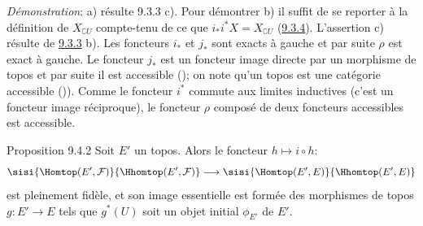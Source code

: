 \documentclass[10pt]{../fichiers-configuration-latex/smfart}
\begin{document}
\noindent \emph{Démonstration}: a) résulte  9.3.3 c). Pour
démontrer b) il suffit de se reporter à la définition
 de $X_{\complement U}$ compte-tenu de ce que
$i_{\ast}i^{\ast}X=X_{\complement U}$ (\hyperref[IV.prop9.3.4]{9.3.4}).
L'assertion c) résulte de \hyperref[IV.prop9.3.3]{9.3.3} b). Les foncteurs
$i_{\ast}$ et $j_{\ast}$ sont exacts à gauche et par suite $\rho$
est exact à gauche. Le foncteur $j_{\ast}$ est un foncteur image
directe par un morphisme de topos et par suite il est accessible
(); on note qu'un topos est une catégorie accessible
()). Comme le foncteur $i^{\ast}$ commute aux
limites inductives (c'est un foncteur image réciproque), le foncteur
$\rho$ composé de deux foncteurs accessibles est accessible.

\begin{enonce*}{Proposition 9.4.2}
Soit $E'$ un topos. Alors le foncteur $h\mapsto i\circ h$:
$$
\sisi{\Homtop(E',\mathcal{F})}{\Hhomtop(E',\mathcal{F})}\longrightarrow
\sisi{\Homtop(E',E)}{\Hhomtop(E',E)}
$$
est pleinement fidèle, et son image essentielle est formée des
morphismes de topos $g:E'\rightarrow E$ tels que $g^{\ast}(U)$ soit
un objet initial $\phi_{E'}$ de $E'$.
\end{enonce*}
\end{document}
